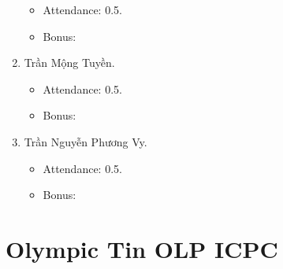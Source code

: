 \documentclass{article}
\begin{document}
\begin{enumerate}
    \begin{itemize}
        \item Attendance: 0.5.
        \item Bonus:
    \end{itemize}
    \item {\sc Trần Mộng Tuyền.}
    \begin{itemize}
        \item Attendance: 0.5.
        \item Bonus:
    \end{itemize}
    \item {\sc Trần Nguyễn Phương Vy.}
    \begin{itemize}
        \item Attendance: 0.5.
        \item Bonus:
    \end{itemize}
\end{enumerate}


\section{Olympic Tin OLP ICPC}
\end{document}
